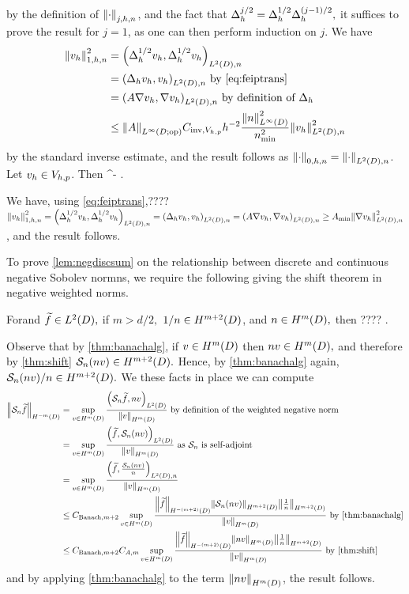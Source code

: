 by the definition of $\Njhn{\cdot}$, and the fact that $\Delta_{h}^{j/2} = \Delta_{h}^{1/2}\Delta_{h}^{(j-1)/2},$ it suffices to prove the result for $j=1$, as one can then perform induction on $j$. We have
\begin{align*}
\Nfn{1,h,n}{\vh}^2 &= \IPLtDn{\Deltahh \vh}{\Deltahh \vh}\\
&= \IPLtDn{\Deltah \vh}{\vh} \text{ by \cref{eq:feiptrans}}\\
&= \IPLtDn{A \grad \vh}{\grad \vh} \text{ by definition of } \Deltah\\
&\leq \NLiDop{A} \CinvVhp h^{-2}\frac{\NLiD{n}^2}{\nmin^2} \NLtDn{\vh}^2
\end{align*}
by the standard inverse estimate, and the result follows as $\Nzhn{\cdot} = \NLtDn{\cdot}$.
\epf
{}\label{lem:h1contdisc}
Let $v_{h} \in V_{h,p}$. Then
\beqs
\SNHoDn{\vh} \leq \Amin^{-\half} \Nohn{\vh}.
\eeqs
\ele

We have, using \cref{eq:feiptrans},???? $\Nohn{\vh}^2 = \IPLtDn{\Deltahh \vh}{\Deltahh \vh} = \IPLtDn{\Deltah \vh}{\vh}= \IPLtDn{A \grad \vh}{\grad \vh} \geq \Amin \NLtDn{\grad \vh}^2$, and the result follows.
\epf



To prove \cref{lem:negdiscsum} on the relationship between discrete and continuous negative Sobolev normns, we require the following  giving the shift theorem in negative weighted norms.

\tohere
{}\label{lem:shiftnegativew}
Forand $\ftilde \in \LtD,$ if $m > d/2,$ $1/n \in \Hfn{}{m+2}{D}$, and $n \in \HmD,$ then
\beqs
???? \leq {} .
\eeqs
\ele

Observe that by \cref{thm:banachalg}, if $v \in \HmD$ then $nv \in \HmD,$ and therefore by \cref{thm:shift} $\sdsol(nv) \in \HmptD.$ Hence, by \cref{thm:banachalg} again, $\sdsol(nv)/n \in \HmptD.$ We these facts in place we can compute
\begin{align*}
\NHnfn{-m}{D}{\sdsol \ftilde} &= \sup_{v \in \HmD} \frac{\IPLtD{\sdsol \ftilde}{nv}}{\NHmD{v}}\text{ by definition of the weighted negative norm}\\
& = \sup_{v \in \HmD} \frac{\IPLtD{ \ftilde}{\sdsol(nv)}}{\NHmD{v}}\text{ as } \sdsol \text{ is self-adjoint}\\
&= \sup_{v \in \HmD} \frac{\IPLtDn{\ftilde}{\frac{\sdsol(nv)}n}}{\NHmD{v}}\\
&\leq \CBanfn{m+2}\sup_{v \in \HmD} \frac{\NHfn{-(m+2)}{D}{\ftilde}\NHfn{m+2}{D}{\sdsol(nv)}\NHfn{m+2}{D}{\frac1n}}{\NHmD{v}} \text{ by \cref{thm:banachalg}}\\
&\leq \CBanfn{m+2}\CAfn{m}\sup_{v \in \HmD} \frac{\NHfn{-(m+2)}{D}{\ftilde}\NHfn{m}{D}{nv}\NHfn{m+2}{D}{\frac1n}}{\NHmD{v}} \text{ by \cref{thm:shift}}\\
\end{align*}
and by applying \cref{thm:banachalg} to the term $\NHfn{m}{D}{nv}$, the result follows.
\epf

